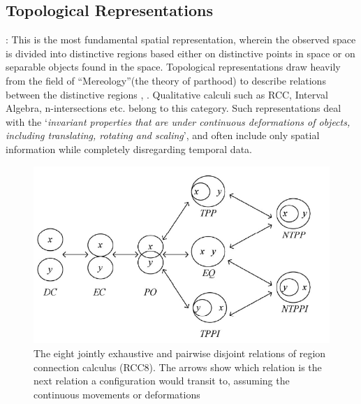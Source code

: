 		
		
		\subsection{Topological Representations} : This is the most fundamental spatial representation\cite{cohn1997qualitative}, \cite{chen2015survey} wherein the observed space is divided into distinctive regions based either on distinctive points in space or on separable objects found in the space. Topological representations draw heavily from the field of ``Mereology''(the theory of parthood) to describe relations between the distinctive regions \cite{cohn2001qualitative}, \cite{cohn2008qualitative}. Qualitative calculi such as RCC, Interval Algebra, n-intersections etc. belong to this category. Such representations deal with the `\textit{invariant properties that are under continuous deformations of objects, including translating, rotating and scaling}', and often include only spatial information while completely disregarding temporal data. 
		
		\begin{figure}[h]
			\centering
			\includegraphics[width=0.7\linewidth]{images/rcc8_rel}
			\caption{The eight jointly exhaustive and pairwise disjoint relations of region connection calculus (RCC8). The arrows show which relation is the next relation a configuration would transit to, assuming the continuous movements or deformations \cite{chen2015survey}}
			\label{fig:rcc8rel}
		\end{figure}
		
		
